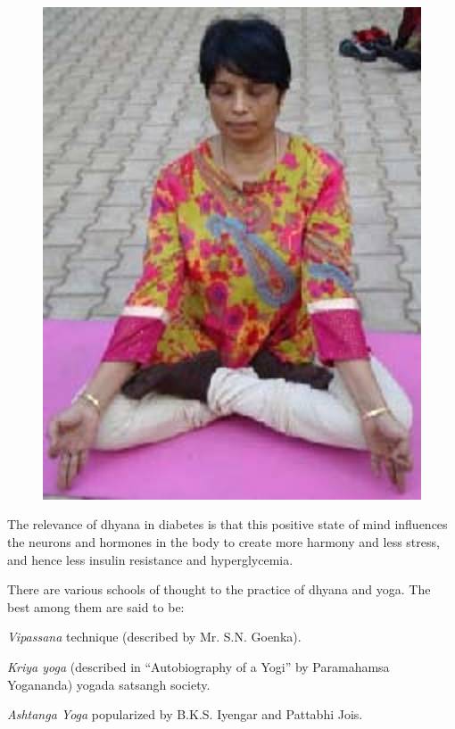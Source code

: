 \begin{figure}
\includegraphics{images/096.jpg}
\end{figure}

The relevance of dhyana in diabetes is that this positive state of mind influences the neurons and hormones in the body to create more harmony and less stress, and hence less insulin resistance and hyperglycemia.

There are various schools of thought to the practice of dhyana and yoga. The best among them are said to be:

\item \textit{Vipassana} technique (described by Mr. S.N. Goenka).

 \item \textit{Kriya yoga} (described in “Autobiography of a Yogi” by Paramahamsa Yogananda) yogada satsangh society.

 \item \textit{Ashtanga Yoga} popularized by B.K.S. Iyengar and Pattabhi Jois.

